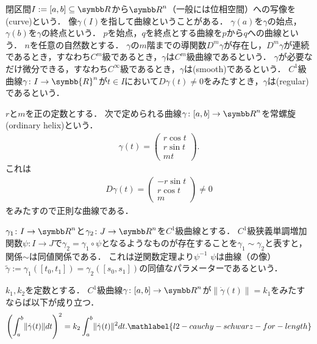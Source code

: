 \documentclass{ltjsbook}
\begin{document}

閉区間\(I := [a, b] \subseteq {\Real}\)から\({\Real}^n\)（一般には位相空間）への写像を(curve)という．
像\(\gamma(I)\)を指して曲線ということがある．
\(\gamma(a)\)を\(\gamma\)の始点，\(\gamma(b)\)を\(\gamma\)の終点という．
\(p\)を始点，\(q\)を終点とする曲線を\(p\)から\(q\)への曲線という．
\(n\)を任意の自然数とする．
\(\gamma\)の\(m\)階までの導関数\(D^m \gamma\)が存在し，\(D^m \gamma\)が連続であるとき，すなわち\(C^m\)級であるとき，\(\gamma\)は\(C^m\)級曲線であるという．
\(\gamma\)が必要なだけ微分できる，すなわち\(C^\infty\)級であるとき，\(\gamma\)は(smooth)であるという．
\(C^1\)級曲線\(\gamma\colon I \to \symbb{R}^n\)が\(t \in I\)において\(D\gamma(t) \neq 0\)をみたすとき，\(\gamma\)は(regular)であるという．

\begin{example} \(r\)と\(m\)を正の定数とする．
次で定められる曲線\(\gamma \colon [a, b] \to {\Real}^n\)を常螺旋(ordinary helix)という．
\begin{align*}
    \gamma(t) = \begin{pmatrix}
        r \cos t \\
        r \sin t \\
        m t
    \end{pmatrix}.
\end{align*}
これは
\begin{align*}
    D\gamma(t) = \begin{pmatrix}
        - r \sin t \\
        r \cos t \\
        m
    \end{pmatrix} \neq 0
\end{align*}
をみたすので正則な曲線である．
\end{example}

\(\gamma_1 \colon I \to {\Real}^n\)と\(\gamma_2 \colon J \to {\Real}^n\)を\(C^1\)級曲線とする．
\(C^1\)級狭義単調増加関数\(\psi \colon I \to J\)で\(\gamma_2 = \gamma_1 \circ \psi\)となるようなものが存在することを\(\gamma_1 \sim \gamma_2\)と表すと，関係\(\sim\)は同値関係である．
これは逆関数定理より\(\psi^{-1}\)
\(\psi\)は曲線（の像）\(\tilde{\gamma} := \gamma_1([t_0, t_1]) = \gamma_2([s_0, s_1])\)の同値なパラメーターであるという．

\begin{thmbox}
\begin{proposition}
\(k_1, k_2\)を定数とする．
\(C^1\)級曲線\(\gamma \colon [a, b] \to {\Real}^n\)が\(\lVert \dot{\gamma}(t) \rVert = k_1\)をみたすならば以下が成り立つ．
\begin{align}
    \left(\int_a^b \lVert \dot{\gamma}(t) \rVert dt \right)^2
    = k_2 \int_a^b \lVert \dot{\gamma}(t) \rVert^2 dt.
    \mathlabel{l2-cauchy-schwarz-for-length}
\end{align}
\end{proposition}
\end{thmbox}
\end{document}
